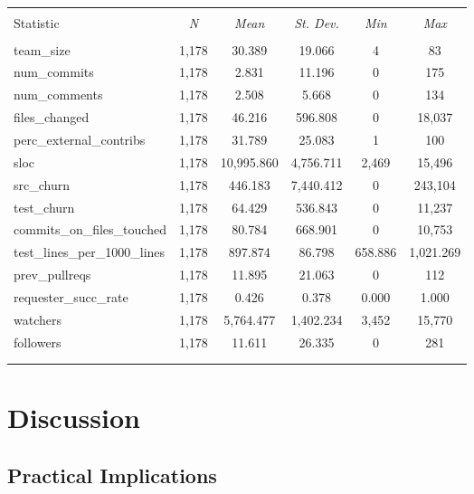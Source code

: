 \documentclass{sig-alternate}
\begin{document}
\begin{table}[htb] \centering 
  \caption{} 
\footnotesize 

\begin{tabular}{@{\extracolsep{5pt}}l c c c c c } 
\\[-1.8ex]\hline 
\hline \\[-1.8ex] 
Statistic & \multicolumn{1}{c}{\textit{N}} & \multicolumn{1}{c}{\textit{Mean}} & \multicolumn{1}{c}{\textit{St. Dev.}} & \multicolumn{1}{c}{\textit{Min}} & \multicolumn{1}{c}{\textit{Max}} \\ 
\hline \\[-1.8ex] 
team\_size & 1,178 & 30.389 & 19.066 & 4 & 83 \\ 
num\_commits & 1,178 & 2.831 & 11.196 & 0 & 175 \\ 
num\_comments & 1,178 & 2.508 & 5.668 & 0 & 134 \\ 
files\_changed & 1,178 & 46.216 & 596.808 & 0 & 18,037 \\ 
perc\_external\_contribs & 1,178 & 31.789 & 25.083 & 1 & 100 \\ 
sloc & 1,178 & 10,995.860 & 4,756.711 & 2,469 & 15,496 \\ 
src\_churn & 1,178 & 446.183 & 7,440.412 & 0 & 243,104 \\ 
test\_churn & 1,178 & 64.429 & 536.843 & 0 & 11,237 \\ 
commits\_on\_files\_touched & 1,178 & 80.784 & 668.901 & 0 & 10,753 \\ 
test\_lines\_per\_1000\_lines & 1,178 & 897.874 & 86.798 & 658.886 & 1,021.269 \\ 
prev\_pullreqs & 1,178 & 11.895 & 21.063 & 0 & 112 \\ 
requester\_succ\_rate & 1,178 & 0.426 & 0.378 & 0.000 & 1.000 \\ 
watchers & 1,178 & 5,764.477 & 1,402.234 & 3,452 & 15,770 \\ 
followers & 1,178 & 11.611 & 26.335 & 0 & 281 \\ 
\hline \\[-1.8ex] 
\normalsize 
\end{tabular} 
\end{table}

\section{Discussion}
\label{sec:discussion}

\subsection{Practical Implications}
\end{document}
